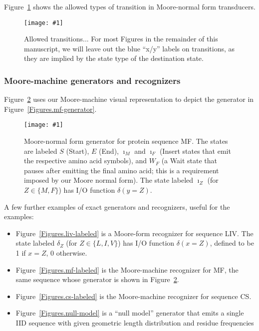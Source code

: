 \documentclass{article}
\newcommand{\figref}[1]{Figure~\ref{Figures.#1}}
\newcommand{\figlabel}[1]{\label{Figures.#1}}
\newcommand{\easyfig}[4]{
\begin{figure}
\texttt{[image: \#1]}
\caption{ \figlabel{#3} #4}
\end{figure}}
\newcommand{\pngfig}[2]{\easyfig{#1.png}{}{#1}{#2}}
\newcommand{\pdffig}[2]{\easyfig{#1-fig.pdf}{}{#1}{#2}}
\begin{document}
\figref{transitions} shows the allowed types of transition in Moore-normal form transducers.
\pngfig{transitions}{Allowed transitions...
For most Figures in the remainder of this manuscript, we will leave out the blue ``x/y'' labels on transitions,
as they are implied by the state type of the destination state.
}


\subsubsection{Moore-machine generators and recognizers}

\figref{moore-mf-generator} uses our Moore-machine visual representation
to depict the generator in \figref{mf-generator}.

\pdffig{moore-mf-generator}{Moore-normal form generator for protein sequence MF.
The states are labeled $S$ (Start), $E$ (End),
$\imath_M$ and $\imath_F$ (Insert states that emit the respective amino acid symbols),
and $W_F$ (a Wait state that pauses after emitting the final amino acid;
this is a requirement imposed by our Moore normal form).
The state labeled $\imath_Z$ (for $Z \in \{M,F\}$) has I/O function $\delta(y=Z)$.}

A few further examples of exact generators and recognizers, useful for the examples:
\begin{itemize}
\item \figref{liv-labeled} is a Moore-form recognizer for sequence LIV.
The state labeled $\delta_Z$  (for $Z \in \{L,I,V\}$) has I/O function $\delta(x=Z)$,
defined to be 1 if $x=Z$, 0 otherwise.
\item \figref{mf-labeled} is the Moore-machine recognizer for MF,
the same sequence whose generator is shown in \figref{moore-mf-generator}.
\item \figref{cs-labeled} is the Moore-machine recognizer for sequence CS.
\item \figref{null-model} is a ``null model'' generator that emits a single IID sequence
with given geometric length distribution and residue frequencies
\end{itemize}
\end{document}

